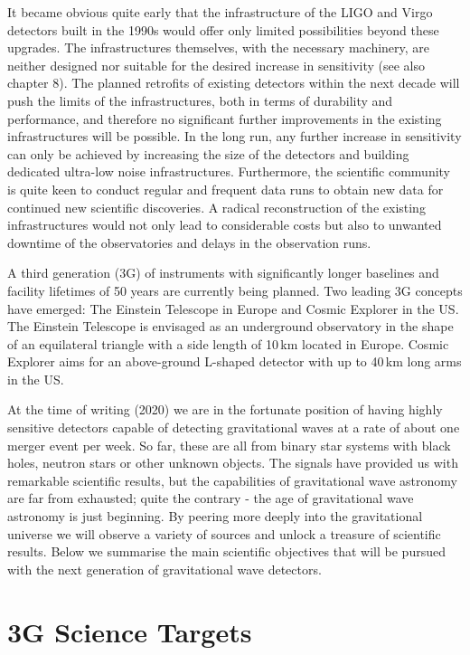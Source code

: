 \documentclass[graybox, nosecnum]{svmult}
\begin{document}
It became obvious quite early that the infrastructure of the LIGO and Virgo detectors built in the 1990s would offer only limited possibilities beyond these upgrades. The infrastructures themselves, with the necessary machinery, are neither designed nor suitable for the desired increase in sensitivity  {\color{green} (see also chapter 8)}. The planned retrofits of existing detectors within the next decade will push the limits of the infrastructures, both in terms of durability and performance, and therefore no significant further improvements in the existing infrastructures will be possible.
In the long run, any further increase in sensitivity can only be achieved by increasing the size of the detectors and building dedicated ultra-low noise infrastructures. Furthermore, the scientific community is quite keen to conduct regular and frequent data runs to obtain new data for continued new scientific discoveries. A radical reconstruction of the existing infrastructures would not only lead to considerable costs but also to unwanted downtime of the observatories and delays in the observation runs.

A third generation (3G) of instruments with significantly longer baselines and facility lifetimes of 50 years are currently being planned. Two leading 3G concepts have emerged: The Einstein Telescope in Europe and Cosmic Explorer in the US. The Einstein Telescope is envisaged as an underground observatory in the shape of an equilateral triangle with a side length of 10\,km located in Europe. Cosmic Explorer aims for an above-ground L-shaped detector with up to 40\,km long arms in the US.

At the time of writing (2020) we are in the fortunate position of having highly sensitive detectors capable of detecting gravitational waves at a rate of about one merger event per week. So far, these are all from binary star systems with black holes, neutron stars or other unknown objects. The signals have provided us with remarkable scientific results, but the capabilities of gravitational wave astronomy are far from exhausted; quite the contrary - the age of gravitational wave astronomy is just beginning. By peering more deeply into the gravitational universe we will observe a variety of sources and unlock a treasure of scientific results. 
Below we summarise the main scientific objectives that will be pursued with the next generation of gravitational wave detectors.

\section{3G Science Targets}
\end{document}
